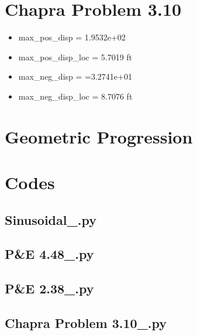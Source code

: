 \documentclass{article}
\begin{document}
\section{Chapra Problem 3.10}
\begin{itemize}
\item max\_pos\_disp = 1.9532e+02
\item max\_pos\_disp\_loc = 5.7019 ft
\item max\_neg\_disp = =3.2741e+01
\item max\_neg\_disp\_loc = 8.7076 ft
\end{itemize}

\section{Geometric Progression}


\pagebreak
\appendix
\section{Codes}




\lstset{style=python103, language=python} 


\subsection{Sinusoidal\_.py}

\clearpage
\subsection{P\&E 4.48\_.py}

\clearpage
\subsection{P\&E 2.38\_.py}

\clearpage
\subsection{Chapra Problem 3.10\_.py}

\clearpage
\end{document}
